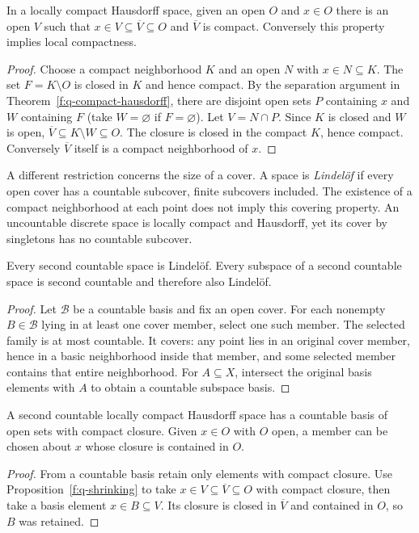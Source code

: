 \begin{proposition}\label{f:q-shrinking}
In a locally compact Hausdorff space, given an open $O$ and $x\in O$ there is an open $V$ such that $x\in V\subseteq\overline V\subseteq O$ and $\overline V$ is compact. Conversely this property implies local compactness.
\end{proposition}
\begin{proof}
Choose a compact neighborhood $K$ and an open $N$ with $x\in N\subseteq K$. The set $F=K\setminus O$ is closed in $K$ and hence compact. By the separation argument in Theorem~\ref{f:q-compact-hausdorff}, there are disjoint open sets $P$ containing $x$ and $W$ containing $F$ (take $W=\varnothing$ if $F=\varnothing$). Let $V=N\cap P$. Since $K$ is closed and $W$ is open, $\overline V\subseteq K\setminus W\subseteq O$. The closure is closed in the compact $K$, hence compact. Conversely $\overline V$ itself is a compact neighborhood of $x$.
\end{proof}

A different restriction concerns the size of a cover. A space is \emph{Lindel\"of} if every open cover has a countable subcover, finite subcovers included. The existence of a compact neighborhood at each point does not imply this covering property. An uncountable discrete space is locally compact and Hausdorff, yet its cover by singletons has no countable subcover.

\begin{proposition}\label{f:q-lindelof}
Every second countable space is Lindel\"of. Every subspace of a second countable space is second countable and therefore also Lindel\"of.
\end{proposition}
\begin{proof}
Let $\mathcal B$ be a countable basis and fix an open cover. For each nonempty $B\in\mathcal B$ lying in at least one cover member, select one such member. The selected family is at most countable. It covers: any point lies in an original cover member, hence in a basic neighborhood inside that member, and some selected member contains that entire neighborhood. For $A\subseteq X$, intersect the original basis elements with $A$ to obtain a countable subspace basis.
\end{proof}

\begin{corollary}\label{f:q-compact-basis}
A second countable locally compact Hausdorff space has a countable basis of open sets with compact closure. Given $x\in O$ with $O$ open, a member can be chosen about $x$ whose closure is contained in $O$.
\end{corollary}
\begin{proof}
From a countable basis retain only elements with compact closure. Use Proposition~\ref{f:q-shrinking} to take $x\in V\subseteq\overline V\subseteq O$ with compact closure, then take a basis element $x\in B\subseteq V$. Its closure is closed in $\overline V$ and contained in $O$, so $B$ was retained.
\end{proof}


